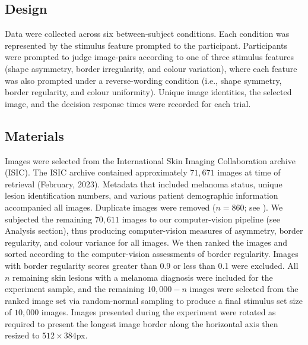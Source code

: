 \documentclass[a4paper, natbib, doc, 12pt]{apa7}
\begin{document}

\subsection{Design}
Data were collected across six between-subject conditions. Each condition was represented by the stimulus feature prompted to the participant. Participants were prompted to judge image-pairs according to one of three stimulus features (shape asymmetry, border irregularity, and colour variation), where each feature was also prompted under a reverse-wording condition (i.e., shape symmetry, border regularity, and colour uniformity). Unique image identities, the selected image, and the decision response times were recorded for each trial. 


\subsection{Materials}
Images were selected from the International Skin Imaging Collaboration archive (ISIC). The ISIC archive contained approximately $71, 671$ images at time of retrieval (February, 2023). Metadata that included melanoma status, unique lesion identification numbers, and various patient demographic information accompanied all images. Duplicate images were removed ($n = 860$; see \cite{cassidy2022analysis}). We subjected the remaining $70, 611$ images to our computer-vision pipeline (see Analysis section), thus producing computer-vision measures of asymmetry, border regularity, and colour variance for all images. We then ranked the images and sorted according to the computer-vision assessments of border regularity. Images with border regularity scores greater than 0.9 or less than 0.1 were excluded. All $n$ remaining skin lesions with a melanoma diagnosis were included for the experiment sample, and the remaining $10,000 - n$ images were selected from the ranked image set via random-normal sampling to produce a final stimulus set size of $10, 000$ images. Images presented during the experiment were rotated as required to present the longest image border along the horizontal axis then resized to $512\times384$px. 
\end{document}
